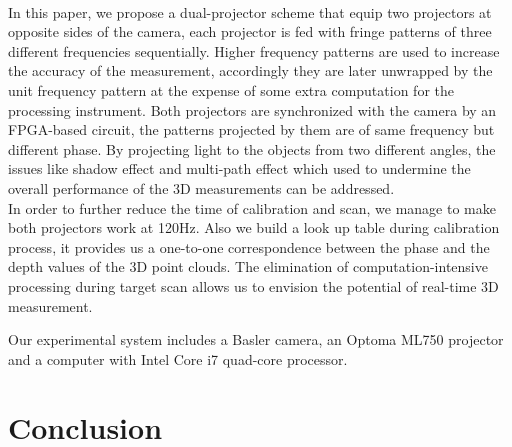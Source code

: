 \documentclass[10pt,letterpaper]{article}
\begin{document}
\\
In this paper, we propose a dual-projector scheme that equip two projectors at opposite sides of the camera, each projector is fed with fringe patterns of three different frequencies sequentially. Higher frequency patterns are used to increase the accuracy of the measurement, accordingly they are later unwrapped by the unit frequency pattern at the expense of some extra computation for the processing instrument. Both projectors are synchronized with the camera by an FPGA-based circuit, the patterns projected by them are of same frequency but different phase. By projecting light to the objects from two different angles, the issues like shadow effect and multi-path effect which used to undermine the overall performance of the 3D measurements can be addressed.\\

In order to further reduce the time of calibration and scan, we manage to make both projectors work at 120Hz. Also we build a look up table during calibration process, it provides us a one-to-one correspondence between the phase and the depth values of the 3D point clouds. The elimination of computation-intensive processing during target scan allows us to envision the potential of real-time 3D measurement.

Our experimental system includes a Basler camera, an Optoma ML750 projector and a computer with Intel Core i7 quad-core processor.



\section{Conclusion}
\end{document}
